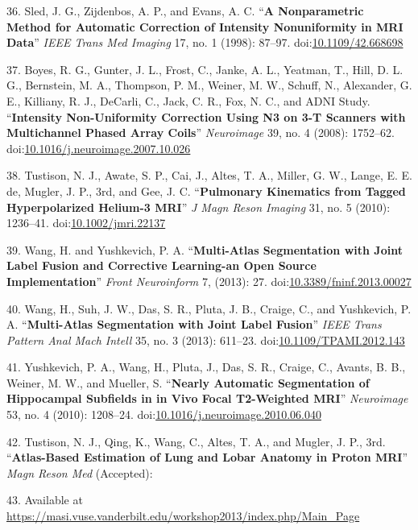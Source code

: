 \documentclass[11pt,]{article}
\begin{document}
36. Sled, J. G., Zijdenbos, A. P., and Evans, A. C. ``\textbf{A
Nonparametric Method for Automatic Correction of Intensity Nonuniformity
in MRI Data}'' \emph{IEEE Trans Med Imaging} 17, no. 1 (1998): 87--97.
doi:\href{http://dx.doi.org/10.1109/42.668698}{10.1109/42.668698}

37. Boyes, R. G., Gunter, J. L., Frost, C., Janke, A. L., Yeatman, T.,
Hill, D. L. G., Bernstein, M. A., Thompson, P. M., Weiner, M. W.,
Schuff, N., Alexander, G. E., Killiany, R. J., DeCarli, C., Jack, C. R.,
Fox, N. C., and ADNI Study. ``\textbf{Intensity Non-Uniformity
Correction Using N3 on 3-T Scanners with Multichannel Phased Array
Coils}'' \emph{Neuroimage} 39, no. 4 (2008): 1752--62.
doi:\href{http://dx.doi.org/10.1016/j.neuroimage.2007.10.026}{10.1016/j.neuroimage.2007.10.026}

38. Tustison, N. J., Awate, S. P., Cai, J., Altes, T. A., Miller, G. W.,
Lange, E. E. de, Mugler, J. P., 3rd, and Gee, J. C. ``\textbf{Pulmonary
Kinematics from Tagged Hyperpolarized Helium-3 MRI}'' \emph{J Magn Reson
Imaging} 31, no. 5 (2010): 1236--41.
doi:\href{http://dx.doi.org/10.1002/jmri.22137}{10.1002/jmri.22137}

39. Wang, H. and Yushkevich, P. A. ``\textbf{Multi-Atlas Segmentation
with Joint Label Fusion and Corrective Learning-an Open Source
Implementation}'' \emph{Front Neuroinform} 7, (2013): 27.
doi:\href{http://dx.doi.org/10.3389/fninf.2013.00027}{10.3389/fninf.2013.00027}

40. Wang, H., Suh, J. W., Das, S. R., Pluta, J. B., Craige, C., and
Yushkevich, P. A. ``\textbf{Multi-Atlas Segmentation with Joint Label
Fusion}'' \emph{IEEE Trans Pattern Anal Mach Intell} 35, no. 3 (2013):
611--23.
doi:\href{http://dx.doi.org/10.1109/TPAMI.2012.143}{10.1109/TPAMI.2012.143}

41. Yushkevich, P. A., Wang, H., Pluta, J., Das, S. R., Craige, C.,
Avants, B. B., Weiner, M. W., and Mueller, S. ``\textbf{Nearly Automatic
Segmentation of Hippocampal Subfields in in Vivo Focal T2-Weighted
MRI}'' \emph{Neuroimage} 53, no. 4 (2010): 1208--24.
doi:\href{http://dx.doi.org/10.1016/j.neuroimage.2010.06.040}{10.1016/j.neuroimage.2010.06.040}

42. Tustison, N. J., Qing, K., Wang, C., Altes, T. A., and Mugler, J.
P., 3rd. ``\textbf{Atlas-Based Estimation of Lung and Lobar Anatomy in
Proton MRI}'' \emph{Magn Reson Med} (Accepted):

43. Available at
\url{https://masi.vuse.vanderbilt.edu/workshop2013/index.php/Main_Page}
\end{document}
